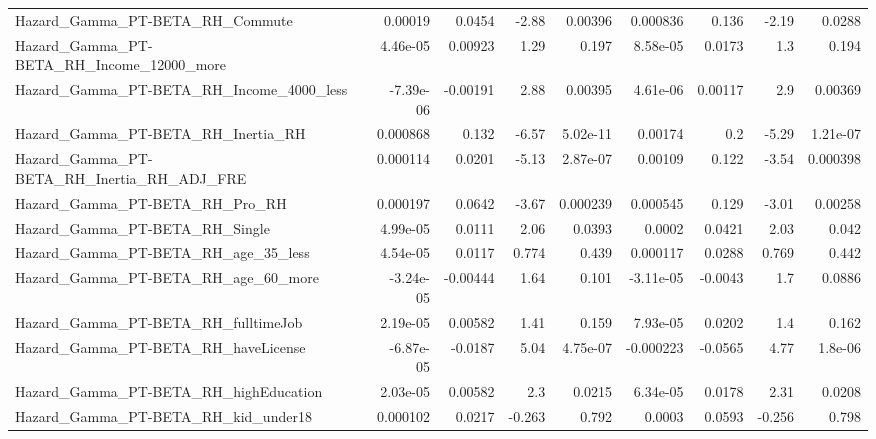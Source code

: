 \begin{tabular}{lrrrrrrrr}
Hazard\_Gamma\_PT-BETA\_RH\_Commute                    &     0.00019 &       0.0454 &    -2.88 &  0.00396 &   0.000836 &       0.136 &        -2.19 &        0.0288 \\
Hazard\_Gamma\_PT-BETA\_RH\_Income\_12000\_more          &    4.46e-05 &      0.00923 &     1.29 &    0.197 &   8.58e-05 &      0.0173 &          1.3 &         0.194 \\
Hazard\_Gamma\_PT-BETA\_RH\_Income\_4000\_less           &   -7.39e-06 &     -0.00191 &     2.88 &  0.00395 &   4.61e-06 &     0.00117 &          2.9 &       0.00369 \\
Hazard\_Gamma\_PT-BETA\_RH\_Inertia\_RH                 &    0.000868 &        0.132 &    -6.57 & 5.02e-11 &    0.00174 &         0.2 &        -5.29 &      1.21e-07 \\
Hazard\_Gamma\_PT-BETA\_RH\_Inertia\_RH\_ADJ\_FRE         &    0.000114 &       0.0201 &    -5.13 & 2.87e-07 &    0.00109 &       0.122 &        -3.54 &      0.000398 \\
Hazard\_Gamma\_PT-BETA\_RH\_Pro\_RH                     &    0.000197 &       0.0642 &    -3.67 & 0.000239 &   0.000545 &       0.129 &        -3.01 &       0.00258 \\
Hazard\_Gamma\_PT-BETA\_RH\_Single                     &    4.99e-05 &       0.0111 &     2.06 &   0.0393 &     0.0002 &      0.0421 &         2.03 &         0.042 \\
Hazard\_Gamma\_PT-BETA\_RH\_age\_35\_less                &    4.54e-05 &       0.0117 &    0.774 &    0.439 &   0.000117 &      0.0288 &        0.769 &         0.442 \\
Hazard\_Gamma\_PT-BETA\_RH\_age\_60\_more                &   -3.24e-05 &     -0.00444 &     1.64 &    0.101 &  -3.11e-05 &     -0.0043 &          1.7 &        0.0886 \\
Hazard\_Gamma\_PT-BETA\_RH\_fulltimeJob                &    2.19e-05 &      0.00582 &     1.41 &    0.159 &   7.93e-05 &      0.0202 &          1.4 &         0.162 \\
Hazard\_Gamma\_PT-BETA\_RH\_haveLicense                &   -6.87e-05 &      -0.0187 &     5.04 & 4.75e-07 &  -0.000223 &     -0.0565 &         4.77 &       1.8e-06 \\
Hazard\_Gamma\_PT-BETA\_RH\_highEducation              &    2.03e-05 &      0.00582 &      2.3 &   0.0215 &   6.34e-05 &      0.0178 &         2.31 &        0.0208 \\
Hazard\_Gamma\_PT-BETA\_RH\_kid\_under18                &    0.000102 &       0.0217 &   -0.263 &    0.792 &     0.0003 &      0.0593 &       -0.256 &         0.798 \\

\end{tabular}
